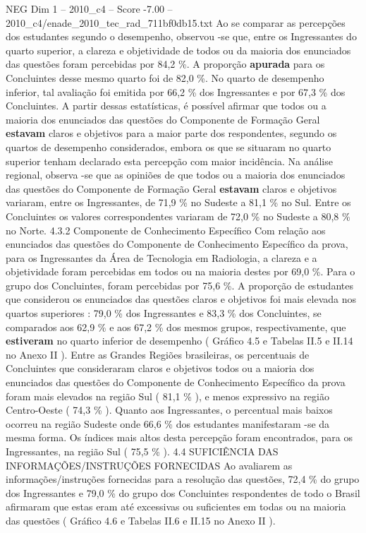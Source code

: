 \begin{textsample}{NEG Dim 1 – 2010\_c4 – Score -7.00 – 2010\_c4/enade\_2010\_tec\_rad\_711bf0db15.txt}
Ao se comparar as percepções dos estudantes segundo o desempenho, observou -se que, entre os Ingressantes do quarto superior, a clareza e objetividade de todos ou da maioria dos enunciados das questões foram percebidas por 84,2 \%.
A proporção \textbf{apurada} para os Concluintes desse mesmo quarto foi de 82,0 \%.
No quarto de desempenho inferior, tal avaliação foi emitida por 66,2 \% dos Ingressantes e por 67,3 \% dos Concluintes.
A partir dessas estatísticas, é possível afirmar que todos ou a maioria dos enunciados das questões do Componente de Formação Geral \textbf{estavam} claros e objetivos para a maior parte dos respondentes, segundo os quartos de desempenho considerados, embora os que se situaram no quarto superior tenham declarado esta percepção com maior incidência.
Na análise regional, observa -se que as opiniões de que todos ou a maioria dos enunciados das questões do Componente de Formação Geral \textbf{estavam} claros e objetivos variaram, entre os Ingressantes, de 71,9 \% no Sudeste a 81,1 \% no Sul.
Entre os Concluintes os valores correspondentes variaram de 72,0 \% no Sudeste a 80,8 \% no Norte. 4.3.2 Componente de Conhecimento Específico Com relação aos enunciados das questões do Componente de Conhecimento Específico da prova, para os Ingressantes da Área de Tecnologia em Radiologia, a clareza e a objetividade foram percebidas em todos ou na maioria destes por 69,0 \%.
Para o grupo dos Concluintes, foram percebidas por 75,6 \%.
A proporção de estudantes que considerou os enunciados das questões claros e objetivos foi mais elevada nos quartos superiores : 79,0 \% dos Ingressantes e 83,3 \% dos Concluintes, se comparados aos 62,9 \% e aos 67,2 \% dos mesmos grupos, respectivamente, que \textbf{estiveram} no quarto inferior de desempenho ( Gráfico 4.5 e Tabelas II.5 e II.14 no Anexo II ).
Entre as Grandes Regiões brasileiras, os percentuais de Concluintes que consideraram claros e objetivos todos ou a maioria dos enunciados das questões do Componente de Conhecimento Específico da prova foram mais elevados na região Sul ( 81,1 \% ), e menos expressivo na região Centro-Oeste ( 74,3 \% ).
Quanto aos Ingressantes, o percentual mais baixos ocorreu na região Sudeste onde 66,6 \% dos estudantes manifestaram -se da mesma forma.
Os índices mais altos desta percepção foram encontrados, para os Ingressantes, na região Sul ( 75,5 \% ). 4.4 SUFICIÊNCIA DAS INFORMAÇÕES/INSTRUÇÕES FORNECIDAS Ao avaliarem as informações/instruções fornecidas para a resolução das questões, 72,4 \% do grupo dos Ingressantes e 79,0 \% do grupo dos Concluintes respondentes de todo o Brasil afirmaram que estas eram até excessivas ou suficientes em todas ou na maioria das questões ( Gráfico 4.6 e Tabelas II.6 e II.15 no Anexo II ).

\end{textsample}
